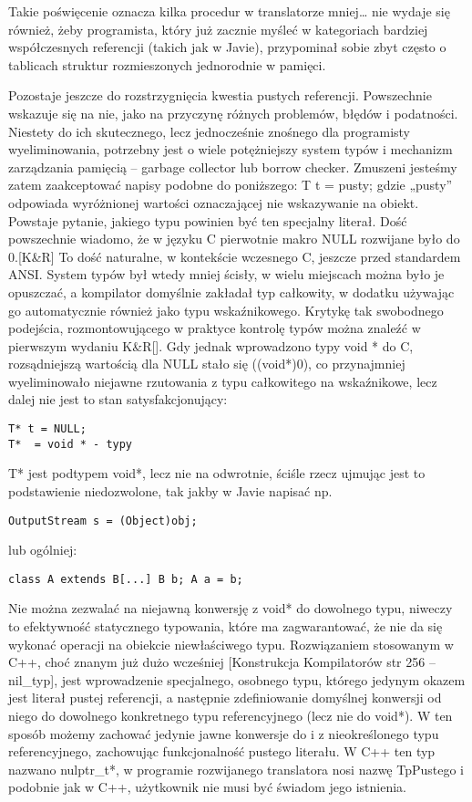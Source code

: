 Takie poświęcenie oznacza kilka procedur w translatorze mniej… nie wydaje się również, żeby programista, który już zacznie myśleć w kategoriach bardziej współczesnych referencji (takich jak w Javie), przypominał sobie zbyt często o tablicach struktur rozmieszonych jednorodnie w pamięci.

Pozostaje jeszcze do rozstrzygnięcia kwestia pustych referencji. Powszechnie wskazuje się na nie, jako na przyczynę różnych problemów, błędów i podatności. Niestety do ich skutecznego, lecz jednocześnie znośnego dla programisty wyeliminowania, potrzebny jest o wiele potężniejszy system typów i mechanizm zarządzania pamięcią – garbage collector lub borrow checker. Zmuszeni jesteśmy zatem zaakceptować napisy podobne do poniższego:
T t = pusty;
 gdzie „pusty” odpowiada wyróżnionej wartości oznaczającej nie wskazywanie na obiekt. Powstaje  pytanie, jakiego typu powinien być ten specjalny literał. Dość powszechnie wiadomo, że w języku C pierwotnie makro NULL rozwijane było do 0.[K\&R] To dość naturalne, w kontekście wczesnego C, jeszcze przed standardem ANSI. System typów był wtedy mniej ścisły, w wielu miejscach można było je opuszczać, a kompilator domyślnie zakładał typ całkowity, w dodatku używając go automatycznie również jako typu wskaźnikowego. Krytykę tak swobodnego podejścia, rozmontowującego w praktyce kontrolę typów można znaleźć w pierwszym wydaniu K\&R[]. Gdy jednak wprowadzono  typy void * do C, rozsądniejszą wartością dla NULL stało się ((void*)0), co przynajmniej wyeliminowało niejawne rzutowania z typu całkowitego na wskaźnikowe, lecz dalej nie jest to stan satysfakcjonujący:
\begin{lstlisting}
T* t = NULL;
T*  = void * - typy
\end{lstlisting}
T* jest podtypem void*, lecz nie na odwrotnie, ściśle rzecz ujmując jest to podstawienie niedozwolone, tak jakby w Javie napisać np.
\begin{lstlisting}
OutputStream s = (Object)obj;
\end{lstlisting}
lub ogólniej:
\begin{lstlisting}
class A extends B[...] B b; A a = b;
\end{lstlisting}
Nie można zezwalać na niejawną konwersję z void* do dowolnego typu, niweczy to efektywność statycznego typowania, które ma zagwarantować, że nie da się wykonać operacji na obiekcie niewłaściwego typu. Rozwiązaniem stosowanym w C++, choć znanym już dużo wcześniej [Konstrukcja Kompilatorów str 256 – nil\_typ], jest wprowadzenie specjalnego, osobnego typu, którego jedynym okazem jest literał pustej referencji, a następnie zdefiniowanie domyślnej konwersji od niego do dowolnego konkretnego typu referencyjnego (lecz nie do void*). W ten sposób możemy zachować jedynie jawne konwersje do i z nieokreślonego typu referencyjnego,  zachowując funkcjonalność pustego literału. W C++ ten typ nazwano nulptr\_t*, w programie rozwijanego translatora nosi nazwę TpPustego i podobnie jak w C++, użytkownik nie musi być świadom jego istnienia.
